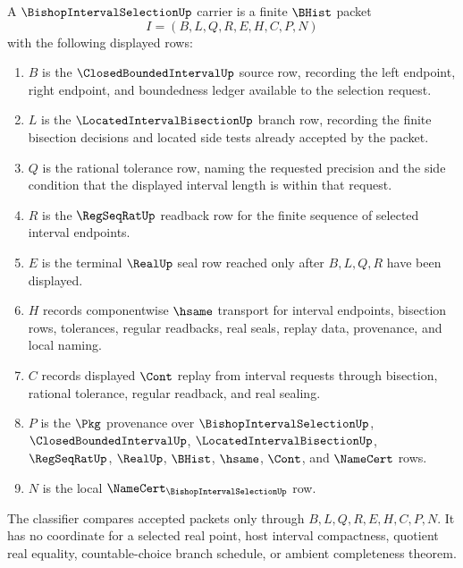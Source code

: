 \begin{definition}
\label{def:bishop-interval-selection-carrier}
A $\BishopIntervalSelectionUp$ carrier is a finite $\BHist$ packet
$$
I=(B,L,Q,R,E,H,C,P,N)
$$
with the following displayed rows:
\begin{enumerate}
\item $B$ is the $\ClosedBoundedIntervalUp$ source row, recording the left endpoint, right endpoint, and boundedness ledger available to the selection request.
\item $L$ is the $\LocatedIntervalBisectionUp$ branch row, recording the finite bisection decisions and located side tests already accepted by the packet.
\item $Q$ is the rational tolerance row, naming the requested precision and the side condition that the displayed interval length is within that request.
\item $R$ is the $\RegSeqRatUp$ readback row for the finite sequence of selected interval endpoints.
\item $E$ is the terminal $\RealUp$ seal row reached only after $B,L,Q,R$ have been displayed.
\item $H$ records componentwise $\hsame$ transport for interval endpoints, bisection rows, tolerances, regular readbacks, real seals, replay data, provenance, and local naming.
\item $C$ records displayed $\Cont$ replay from interval requests through bisection, rational tolerance, regular readback, and real sealing.
\item $P$ is the $\Pkg$ provenance over $\BishopIntervalSelectionUp$, $\ClosedBoundedIntervalUp$, $\LocatedIntervalBisectionUp$, $\RegSeqRatUp$, $\RealUp$, $\BHist$, $\hsame$, $\Cont$, and $\NameCert$ rows.
\item $N$ is the local $\NameCert_{\BishopIntervalSelectionUp}$ row.
\end{enumerate}
The classifier compares accepted packets only through $B,L,Q,R,E,H,C,P,N$. It has no coordinate for a selected real point, host interval compactness, quotient real equality, countable-choice branch schedule, or ambient completeness theorem.
\end{definition}

